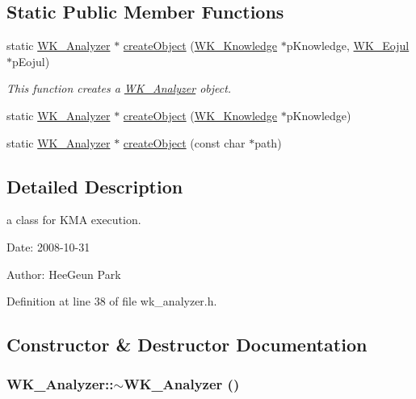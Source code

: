 \subsection*{Static Public Member Functions}
\begin{CompactItemize}
\item 
static \hyperlink{classWK__Analyzer}{WK\_\-Analyzer} $\ast$ \hyperlink{classWK__Analyzer_3c9feae7eb43ef3363dcc6a6166c5dc3}{createObject} (\hyperlink{classWK__Knowledge}{WK\_\-Knowledge} $\ast$pKnowledge, \hyperlink{classWK__Eojul}{WK\_\-Eojul} $\ast$pEojul)
\begin{CompactList}\small\item\em This function creates a \hyperlink{classWK__Analyzer}{WK\_\-Analyzer} object. \item\end{CompactList}\item 
static \hyperlink{classWK__Analyzer}{WK\_\-Analyzer} $\ast$ \hyperlink{classWK__Analyzer_19eb8ec6afe38fae9f713e97a7b2b1a3}{createObject} (\hyperlink{classWK__Knowledge}{WK\_\-Knowledge} $\ast$pKnowledge)
\item 
static \hyperlink{classWK__Analyzer}{WK\_\-Analyzer} $\ast$ \hyperlink{classWK__Analyzer_d9f2c2827683633f99176501680699ae}{createObject} (const char $\ast$path)
\end{CompactItemize}


\subsection{Detailed Description}
a class for KMA execution. 

\begin{Desc}
\item[Date:]2008-10-31 \end{Desc}
\begin{Desc}
\item[Author:]HeeGeun Park \end{Desc}


Definition at line 38 of file wk\_\-analyzer.h.

\subsection{Constructor \& Destructor Documentation}
\hypertarget{classWK__Analyzer_ef4b10cb9dd4554a77284179042a8384}{
\subsubsection[{$\sim$WK\_\-Analyzer}]{\setlength{\rightskip}{0pt plus 5cm}WK\_\-Analyzer::$\sim$WK\_\-Analyzer ()}}
\label{classWK__Analyzer_ef4b10cb9dd4554a77284179042a8384}




